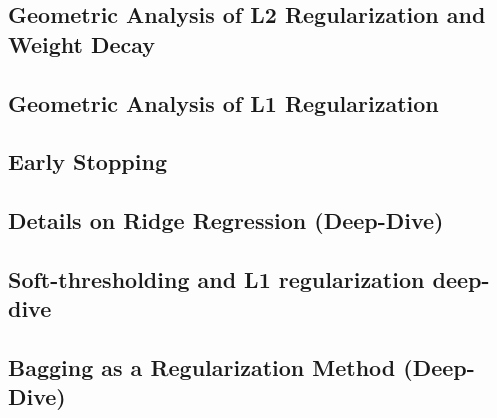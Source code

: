 \subsection{Geometric Analysis of L2 Regularization and Weight Decay}


\subsection{Geometric Analysis of L1 Regularization}


\subsection{Early Stopping}


\subsection{Details on Ridge Regression (Deep-Dive)}


\subsection{Soft-thresholding and L1 regularization deep-dive}


\subsection{Bagging as a Regularization Method (Deep-Dive)}







